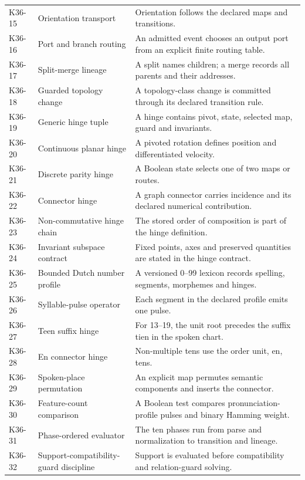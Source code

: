 \begin{longtable}{@{}p{}p{}p{}@{}}
K36-15 & Orientation transport & Orientation follows the declared maps and transitions.\\[5pt]
K36-16 & Port and branch routing & An admitted event chooses an output port from an explicit finite routing table.\\[5pt]
K36-17 & Split-merge lineage & A split names children; a merge records all parents and their addresses.\\[5pt]
K36-18 & Guarded topology change & A topology-class change is committed through its declared transition rule.\\[5pt]
K36-19 & Generic hinge tuple & A hinge contains pivot, state, selected map, guard and invariants.\\[5pt]
K36-20 & Continuous planar hinge & A pivoted rotation defines position and differentiated velocity.\\[5pt]
K36-21 & Discrete parity hinge & A Boolean state selects one of two maps or routes.\\[5pt]
K36-22 & Connector hinge & A graph connector carries incidence and its declared numerical contribution.\\[5pt]
K36-23 & Non-commutative hinge chain & The stored order of composition is part of the hinge definition.\\[5pt]
K36-24 & Invariant subspace contract & Fixed points, axes and preserved quantities are stated in the hinge contract.\\[5pt]
K36-25 & Bounded Dutch number profile & A versioned 0--99 lexicon records spelling, segments, morphemes and hinges.\\[5pt]
K36-26 & Syllable-pulse operator & Each segment in the declared profile emits one pulse.\\[5pt]
K36-27 & Teen suffix hinge & For 13--19, the unit root precedes the suffix tien in the spoken chart.\\[5pt]
K36-28 & En connector hinge & Non-multiple tens use the order unit, en, tens.\\[5pt]
K36-29 & Spoken-place permutation & An explicit map permutes semantic components and inserts the connector.\\[5pt]
K36-30 & Feature-count comparison & A Boolean test compares pronunciation-profile pulses and binary Hamming weight.\\[5pt]
K36-31 & Phase-ordered evaluator & The ten phases run from parse and normalization to transition and lineage.\\[5pt]
K36-32 & Support-compatibility-guard discipline & Support is evaluated before compatibility and relation-guard solving.\\[5pt]

\end{longtable}
